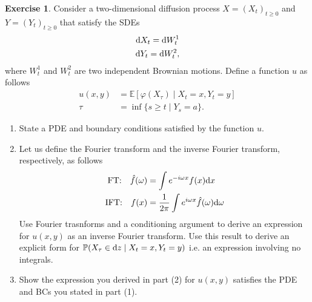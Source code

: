 \documentclass[12pt]{article}
\newcommand{\Prob}{\mathbb{P}}
\newcommand{\Expect}{\mathbb{E}}
\renewcommand{\phi}{\varphi}
\theoremstyle{definition}
\newtheorem{exer}{Exercise}
\theoremstyle{remark}
\def\d{{\rm d}}
\begin{document}
\begin{exer}
    Consider a two-dimensional diffusion process $X = (X_{t})_{t\geq 0}$ and $Y = (Y_{t})_{t\geq 0}$ that satisfy the SDEs
    \begin{align*}
    \d X_{t} = \d W_{t}^{1}\\
    \d Y_{t} = \d W_{t}^{2},
    \end{align*}
    where $W_{t}^{1}$ and $W_{t}^{2}$ are two independent Brownian motions. Define a function $u$ as follows 
    \begin{align*}
        u(x, y) &= \Expect[ \phi(X_{\tau}) \mid X_{t} = x, Y_{t} = y ]\\
        \tau &= \inf\{ s \geq t \mid Y_{s} = a\}.
    \end{align*}
    \begin{enumerate}
        \item State a PDE and boundary conditions satisfied by the function $u$.
        \item Let us define the Fourier transform and the inverse Fourier transform, respectively, as follows
            \begin{align*}
                \text{FT:} \quad \hat{f}(\omega) &= \int e^{- i \omega x} f(x) \d x\\
                \text{IFT:} \quad f(x) &= \frac{1}{2\pi} \int e^{i \omega x} \hat{f}(\omega) \d \omega
            \end{align*}
            Use Fourier trasnforms and a conditioning argument to derive an expression for $u(x,y)$ as an inverse Fourier transform. Use this result to derive an explicit form for  $\Prob(X_{\tau} \in \d z \mid X_{t} = x , Y_{t} = y)$ i.e. an expression involving no integrals.
        \item Show the expression you derived in part (2) for $u(x,y)$ satisfies the PDE and BCs you stated in part (1).
    \end{enumerate}
\end{exer}
\end{document}
